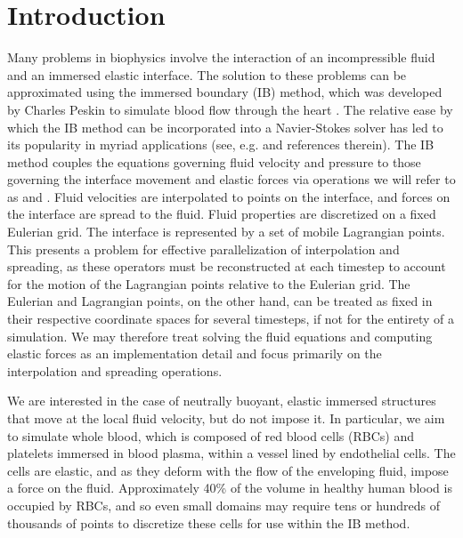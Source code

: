 \section{Introduction}

Many problems in biophysics involve the interaction of an incompressible fluid and an
immersed elastic interface. The solution to these problems can be approximated using the
immersed boundary (IB) method, which was developed by Charles Peskin to simulate blood
flow through the heart \cite{Peskin:1972wa}. The relative ease by which the IB method can
be incorporated into a Navier-Stokes solver has led to its popularity in myriad
applications (see, e.g. \cite{Iaccarino:2005ii,Griffith:2020hi} and references therein).
The IB method couples the equations governing fluid velocity and pressure to those
governing the interface movement and elastic forces via operations we will refer to as
 and . Fluid velocities are interpolated to points on
the interface, and forces on the interface are spread to the fluid. Fluid properties are
discretized on a fixed Eulerian grid. The interface is represented by a set of mobile
Lagrangian points. This presents a problem for effective parallelization of interpolation
and spreading, as these operators must be reconstructed at each timestep to account for
the motion of the Lagrangian points relative to the Eulerian grid. The Eulerian and
Lagrangian points, on the other hand, can be treated as fixed in their respective
coordinate spaces for several timesteps, if not for the entirety of a simulation. We may
therefore treat solving the fluid equations and computing elastic forces as an
implementation detail and focus primarily on the interpolation and spreading operations.

We are interested in the case of neutrally buoyant, elastic immersed structures that move
at the local fluid velocity, but do not impose it. In particular, we aim to simulate
whole blood, which is composed of red blood cells (RBCs) and platelets immersed in blood
plasma, within a vessel lined by endothelial cells. The cells are elastic, and as they
deform with the flow of the enveloping fluid, impose a force on the fluid.  Approximately
40\% of the volume in healthy human blood is occupied by RBCs, and so even small domains
may require tens or hundreds of thousands of points to discretize these cells for use
within the IB method.

